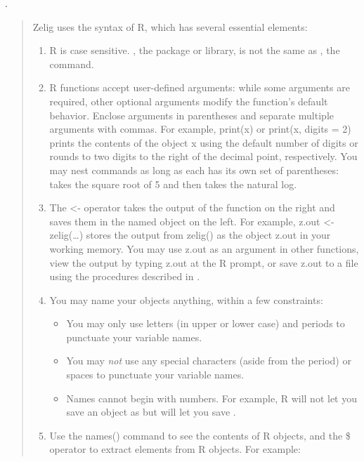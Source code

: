 \documentclass[letterpaper,10pt,english]{sphinxmanual}
\begin{document}
.
\begin{quote}

Zelig uses the syntax of R, which has several essential elements:
\begin{enumerate}
\item {} 
R is case sensitive. , the package or library, is not the
same as , the command.

\item {} 
R functions accept user-defined arguments: while some arguments are
required, other optional arguments modify the function’s default
behavior. Enclose arguments in parentheses and separate multiple
arguments with commas. For example, print(x) or print(x, digits = 2)
prints the contents of the object x using the default number of
digits or rounds to two digits to the right of the decimal point,
respectively. You may nest commands as long as each has its own set
of parentheses:  takes the square root of 5 and then
takes the natural log.

\item {} 
The \textless{}- operator takes the output of the function on the right and
saves them in the named object on the left. For example, z.out \textless{}-
zelig(…) stores the output from zelig() as the object z.out in your
working memory. You may use z.out as an argument in other functions,
view the output by typing z.out at the R prompt, or save z.out to a
file using the procedures described in .

\item {} 
You may name your objects anything, within a few constraints:
\begin{itemize}
\item {} 
You may only use letters (in upper or lower case) and periods to
punctuate your variable names.

\item {} 
You may \emph{not} use any special characters (aside from the period)
or spaces to punctuate your variable names.

\item {} 
Names cannot begin with numbers. For example, R will not let you
save an object as  but will let you save
.

\end{itemize}

\item {} 
Use the names() command to see the contents of R objects, and the \$
operator to extract elements from R objects. For example:


\end{enumerate}
\end{quote}
\end{document}
